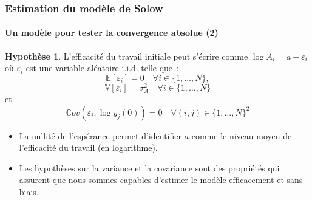 \documentclass[10pt,notheorems]{beamer}
\theoremstyle{plain}
\theoremstyle{definition} %
\newtheorem{assumption}{Hypothèse}
\begin{document}
\begin{frame}
  \frametitle{Estimation du modèle de Solow}
  \framesubtitle{Un modèle pour tester la convergence absolue (2)}

  \begin{assumption}
    L'efficacité du travail initiale peut s'écrire comme $\log A_i = a + \varepsilon_i$ où $\varepsilon_i$ est une variable aléatoire i.i.d. telle que~:
    \[
      \mathbb E [\varepsilon_i] = 0 \quad \forall i\in\{1,\ldots,N\},
    \]
    \[
      \mathbb V [\varepsilon_i] = \sigma_A^2 \quad \forall i\in\{1,\ldots,N\}
    \]
    et
    \[
      \mathbb Cov(\varepsilon_i, \log y_j(0)) = 0 \quad \forall (i,j)\in\{1,\ldots,N\}^2
    \]
  \end{assumption}


  \begin{itemize}

  \item La nullité de l'espérance permet d'identifier $a$ comme le niveau moyen de l'efficacité du travail (en logarithme).\newline

  \item Les hypothèses sur la variance et la covariance sont des propriétés qui
    assurent que nous sommes capables d'estimer le modèle efficacement et sans
    biais.

  \end{itemize}

\end{frame}
\end{document}
